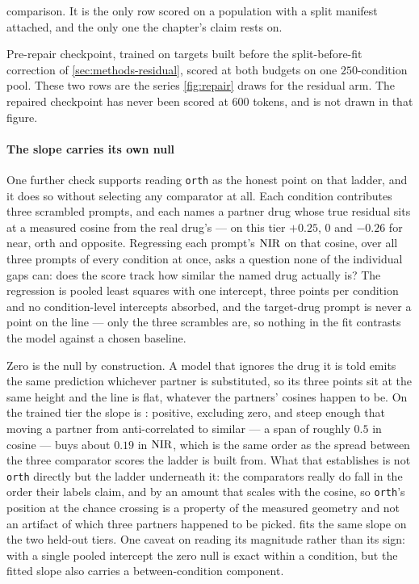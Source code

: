 \begin{table}[htbp]
\begin{fullwidth}
\begin{threeparttable}
\begin{tablenotes}[flushleft]
  comparison. It is the only row scored on a population with a split manifest
  attached, and the only one the chapter's claim rests on.
  \item[b] Pre-repair checkpoint, trained on targets built before the
  split-before-fit correction of \cref{sec:methods-residual}, scored at both
  budgets on one $\num{250}$-condition pool. These two rows are the series
  \cref{fig:repair} draws for the residual arm. The repaired checkpoint has never
  been scored at $600$ tokens, and is not drawn in that figure.
  \end{tablenotes}
  \end{threeparttable}
  \end{fullwidth}
  \end{table}

  \paragraph{The slope carries its own null}
  One further check supports reading \texttt{orth} as the honest point on that
ladder, and it does so without selecting any comparator at all. Each condition
contributes three scrambled prompts, and each names a partner drug whose true
residual sits at a measured cosine from the real drug's --- on this tier
$+0.25$, $0$ and $-0.26$ for near, orth and opposite.  Regressing each prompt's $\textrm{NIR}$ on
that cosine, over all three prompts of every condition at once, asks a question
none of the individual gaps can: does the score track how similar the named drug
actually is? The regression is pooled least squares with one intercept, three
points per condition and no condition-level intercepts absorbed, and the
target-drug prompt is never a point on the line --- only the three scrambles
are, so nothing in the fit contrasts the model against a chosen baseline.

Zero is the null by construction. A model that ignores the drug it is told
emits the same prediction whichever partner is substituted, so its three points
sit at the same height and the line is flat, whatever the partners' cosines
happen to be. On the trained tier the slope is :
positive, excluding zero, and steep enough that moving a partner from
anti-correlated to similar --- a span of roughly $0.5$ in cosine --- buys about
$0.19$ in $\textrm{NIR}$, which is the same order as the spread between the three
comparator scores the ladder is built from. What that establishes is not
\texttt{orth} directly but the ladder underneath it: the comparators really do
fall in the order their labels claim, and by an amount that scales with the
cosine, so \texttt{orth}'s position at the chance crossing is a property of the
measured geometry and not an artifact of which three partners happened to be
picked.  fits the same slope on the two held-out
tiers. One caveat on reading its magnitude rather than its sign: with a single
pooled intercept the zero null is exact within a condition, but the fitted slope
also carries a between-condition component.


